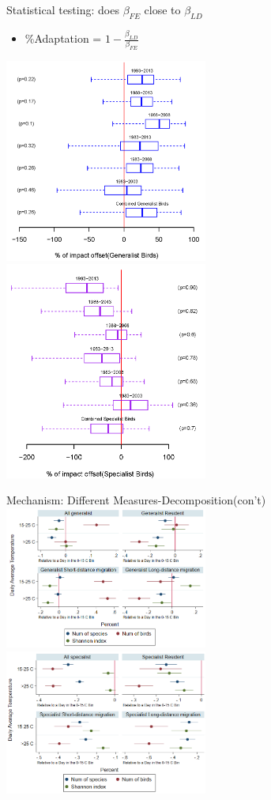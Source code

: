 \documentclass[handout]{beamer}
\begin{document}
\begin{frame}{Statistical testing: does $\beta_{FE}$ close to $\beta_{LD}$}
  \begin{itemize}
    \item \%Adaptation = $1-\frac{\beta_{LD}}{\beta_{FE}}$
  \end{itemize}
\includegraphics[width=0.5\textwidth]{long_diff1.png}%
\includegraphics[width=0.5\textwidth]{long_diff2.png}
\end{frame}



\begin{frame}{Mechanism: Different Measures-Decomposition(con't)}
  \includegraphics[width=0.5\textwidth]{bird_figure2b}%
  \includegraphics[width=0.5\textwidth]{bird_figure2c}
\end{frame}
\end{document}
